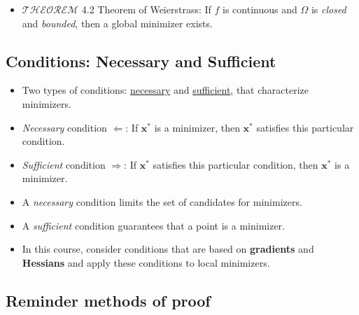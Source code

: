 \documentclass[12pt,thmsa]{article}
\begin{document}
\begin{itemize}
	\item \(\mathscr{THEOREM}\) 4.2 Theorem of Weierstrass: If \(f\) is continuous and \(\Omega\) is \textit{closed} and \textit{bounded}, then a global minimizer exists.
\end{itemize}

\subsection{Conditions: Necessary and Sufficient}
\begin{itemize}
	
	\item Two types of conditions: \underline{necessary} and \underline{sufficient}, that characterize minimizers.
	
	\item \textit{Necessary} condition \(\Longleftarrow\): If \(\boldsymbol{x}^{*}\) is a minimizer, then \(\boldsymbol{x}^{*}\) satisfies this particular condition.
	
	\item \textit{Sufficient} condition \(\Longrightarrow\): If \(\boldsymbol{x}^{*}\) satisfies this particular condition, then \(\boldsymbol{x}^{*}\) is a minimizer.
	
	\item A \textit{necessary} condition limits the set of candidates for minimizers.
	
	\item A \textit{sufficient} condition guarantees that a point is a minimizer.
	
	\item In this course, consider conditions that are based on \textbf{gradients} and \textbf{Hessians} and apply these conditions to local minimizers.
	
\end{itemize}


\subsection{Reminder methods of proof}
\end{document}
